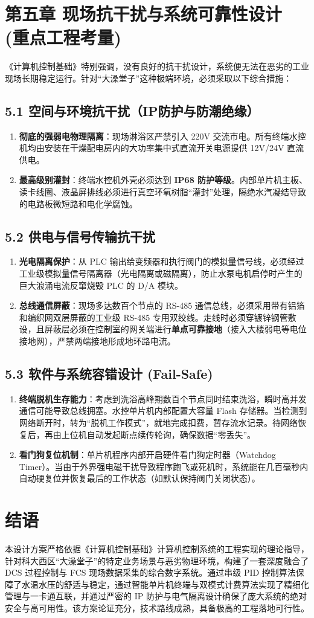 \documentclass[11pt,a4paper,UTF8]{ctexart}
\begin{document}
\section{第五章 现场抗干扰与系统可靠性设计 (重点工程考量)}
《计算机控制基础》特别强调，没有良好的抗干扰设计，系统便无法在恶劣的工业现场长期稳定运行。针对“大澡堂子”这种极端环境，必须采取以下综合措施：

\subsection{5.1 空间与环境抗干扰（IP防护与防潮绝缘）}
\begin{enumerate}
    \item \textbf{彻底的强弱电物理隔离}：现场淋浴区严禁引入 220V 交流市电。所有终端水控机均由安装在干燥配电房内的大功率集中式直流开关电源提供 12V/24V 直流供电。
    \item \textbf{最高级别灌封}：终端水控机外壳必须达到 \textbf{IP68 防护等级}。内部单片机主板、读卡线圈、液晶屏排线必须进行真空环氧树脂“灌封”处理，隔绝水汽凝结导致的电路板微短路和电化学腐蚀。
\end{enumerate}

\subsection{5.2 供电与信号传输抗干扰}
\begin{enumerate}
    \item \textbf{光电隔离保护}：从 PLC 输出给变频器和执行阀门的模拟量信号线，必须经过工业级模拟量信号隔离器（光电隔离或磁隔离），防止水泵电机启停时产生的巨大浪涌电流反窜烧毁 PLC 的 D/A 模块。
    \item \textbf{总线通信屏蔽}：现场多达数百个节点的 RS-485 通信总线，必须采用带有铝箔和编织网双层屏蔽的工业级 RS-485 专用双绞线。走线时必须穿镀锌钢管敷设，且屏蔽层必须在控制室的网关端进行\textbf{单点可靠接地}（接入大楼弱电等电位接地网），严禁两端接地形成地环路电流。
\end{enumerate}

\subsection{5.3 软件与系统容错设计 (Fail-Safe)}
\begin{enumerate}
    \item \textbf{终端脱机生存能力}：考虑到洗浴高峰期数百个节点同时结束洗浴，瞬时高并发通信可能导致总线拥塞。水控单片机内部配置大容量 Flash 存储器。当检测到网络断开时，转为“脱机工作模式”，就地完成扣费，暂存流水记录。待网络恢复后，再由上位机自动发起断点续传轮询，确保数据“零丢失”。
    \item \textbf{看门狗复位机制}：单片机程序内部开启硬件看门狗定时器（Watchdog Timer）。当由于外界强电磁干扰导致程序跑飞或死机时，系统能在几百毫秒内自动硬复位并恢复最后的工作状态（如默认保持阀门关闭状态）。
\end{enumerate}


\section{结语}
本设计方案严格依据《计算机控制基础》计算机控制系统的工程实现的理论指导，针对科大西区“大澡堂子”的特定业务场景与恶劣物理环境，构建了一套深度融合了 DCS 过程控制与 FCS 现场数据采集的综合数字系统。通过串级 PID 控制算法保障了水温水压的舒适与稳定，通过智能单片机终端与双模式计费算法实现了精细化管理与一卡通互联，并通过严密的 IP 防护与电气隔离设计确保了庞大系统的绝对安全与高可用性。该方案论证充分，技术路线成熟，具备极高的工程落地可行性。
\end{document}

